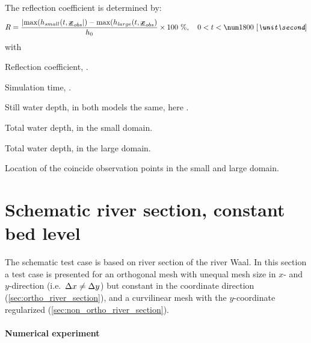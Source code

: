 The reflection coefficient is determined by:
\begin{align}
    R = \frac{  \abs{\max(h_{\mathit small}(t,\vec{x}_{\mathit obs}}) - \max(h_{\mathit large}(t,\vec{x}_{\mathit obs})}{h_0} \times 100\ \%, \quad 0 < t < \bqty{1800}{\second}
\end{align}
with
\begin{symbollist}
    \item[$R$] Reflection coefficient, \bunit{-}.
    \item[$t$] Simulation time, \bunit{\second}.
    \item[$h_0$] Still water depth, in both models the same, here .
    \item[$h_{\mathit small}$] Total water depth, in the small domain.
    \item[$h_{\mathit large}$] Total water depth, in the large domain.
    \item[$\vec{x}_{\mathit obs}$] Location of the coincide observation points in the small and large domain.
\end{symbollist}
    \notyet
\section{Schematic river section, constant bed level}
The schematic test case is based on river section of the river Waal.
In this section a test case is presented for an orthogonal mesh with unequal mesh size in $x$- and $y$-direction (i.e.\ $\Delta x \neq \Delta y$) but constant in the coordinate direction (\autoref{sec:ortho_river_section}), and a curvilinear mesh with the $y$-coordinate regularized (\autoref{sec:non_ortho_river_section}).

\paragraph*{Numerical experiment}


